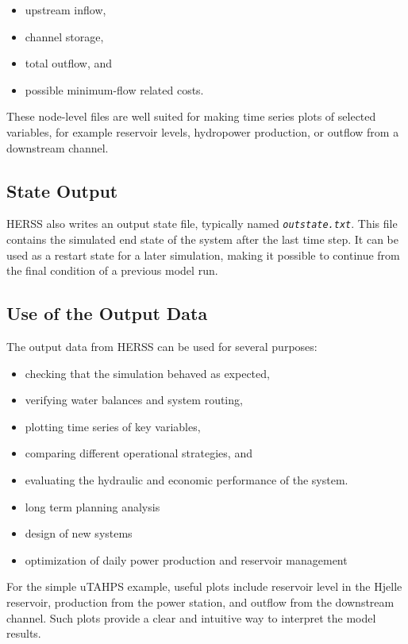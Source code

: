\documentclass[a4paper, 12pt]{report}
\newcommand{\file}[1]{\textit{\texttt{#1}}}  %
\begin{document}
	\begin{itemize}
		\item upstream inflow,
		\item channel storage,
		\item total outflow, and
		\item possible minimum-flow related costs.
	\end{itemize}

	These node-level files are well suited for making time series plots of selected variables, for example reservoir levels, hydropower production, or outflow from a downstream channel.

	\subsection{State Output}

	HERSS also writes an output state file, typically named \file{outstate.txt}. This file contains the simulated end state of the system after the last time step. It can be used as a restart state for a later simulation, making it possible to continue from the final condition of a previous model run.


	\subsection{Use of the Output Data}
	The output data from HERSS can be used for several purposes:

	\begin{itemize}
		\item checking that the simulation behaved as expected,
		\item verifying water balances and system routing,
		\item plotting time series of key variables,
		\item comparing different operational strategies, and
		\item evaluating the hydraulic and economic performance of the system.
		\item long term planning analysis
		\item design of new systems
		\item optimization of daily power production and reservoir management
	\end{itemize}

	For the simple uTAHPS example, useful plots include reservoir level in the Hjelle reservoir, production from the power station, and outflow from the downstream channel. Such plots provide a clear and intuitive way to interpret the model results. \\
	
\end{document}
